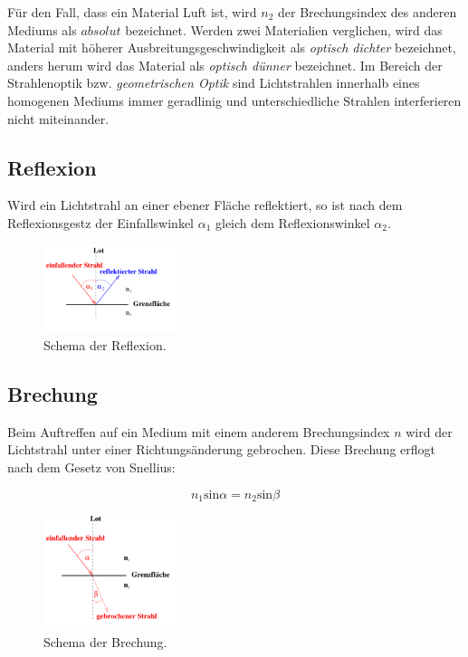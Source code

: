     \noindent Für den Fall, dass ein Material Luft ist, wird $n_2$ der Brechungsindex des anderen Mediums als $absolut$ bezeichnet. Werden zwei 
    Materialien verglichen, wird das Material mit höherer Ausbreitungsgeschwindigkeit als \textit{optisch dichter} bezeichnet, anders herum wird das 
    Material als \textit{optisch dünner} bezeichnet. Im Bereich der Strahlenoptik bzw. \textit{geometrischen Optik} sind Lichtstrahlen innerhalb eines 
    homogenen Mediums immer geradlinig und unterschiedliche Strahlen interferieren nicht miteinander.

    \subsection{Reflexion}

        \noindent Wird ein Lichtstrahl an einer ebener Fläche reflektiert, so ist nach dem Reflexionsgestz der Einfallswinkel $\alpha_1$ gleich dem
        Reflexionswinkel $\alpha_2$.

        \begin{figure}[H]
            \centering
            \includegraphics[width=0.35\textwidth]{latex/images/T2.PNG}
            \caption{Schema der Reflexion\protect \cite{400}.}
        \end{figure}

    \subsection{Brechung}

        \noindent Beim Auftreffen auf ein Medium mit einem anderem Brechungsindex $n$ wird der Lichtstrahl unter einer Richtungsänderung 
        gebrochen. Diese Brechung erflogt nach dem Gesetz von Snellius:

        \begin{equation}
            n_1 \text{sin} \alpha = n_2 \text{sin} \beta
        \end{equation}

        \begin{figure}[H]
            \centering
            \includegraphics[width=0.35\textwidth]{latex/images/T3.PNG}
            \caption{Schema der Brechung\protect \cite{400}.}
        \end{figure}


